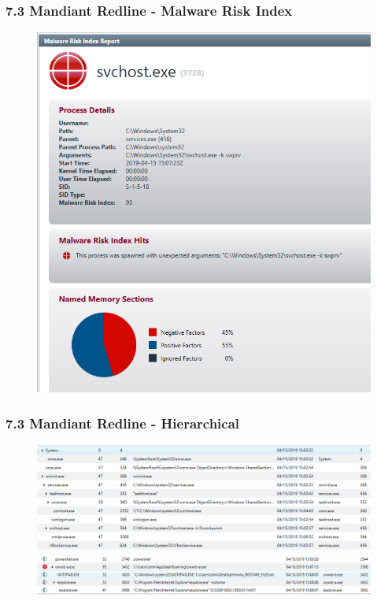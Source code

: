 \begin{frame}
  \frametitle{7.3 Mandiant Redline - Malware Risk Index}
  \begin{figure}
    \begin{center}
      \includegraphics[scale=0.35]{images/f12_redline-4.png}
    \end{center}
  \end{figure}
\end{frame}

\begin{frame}
  \frametitle{7.3 Mandiant Redline - Hierarchical}
  \begin{figure}
    \begin{center}
      \includegraphics[scale=0.42]{images/f12_redline-5.png}

      \vspace{0.2cm}

      \includegraphics[scale=0.4]{images/f12_redline-7.png}
    \end{center}
  \end{figure}
\end{frame}

